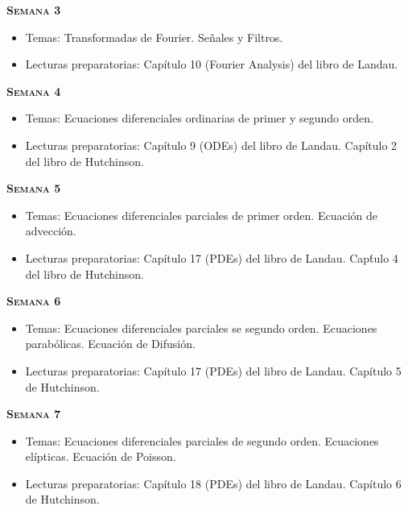 \documentclass[letterpaper,10pt,onecolumn]{article}
\begin{document}
\noindent\textbf{\textsc{Semana 3}}\\[-0.5cm]
\begin{itemize}
\item Temas: Transformadas de Fourier. Se\~nales y Filtros. \\[-0.6cm]
\item Lecturas preparatorias: Cap\'itulo 10 (Fourier Analysis) del
  libro de Landau.\\[-0.6cm] 
\end{itemize}


\noindent\textbf{\textsc{Semana 4}}\\[-0.5cm]
\begin{itemize}
\item Temas: Ecuaciones diferenciales ordinarias de primer y segundo orden. \\[-0.6cm]
\item Lecturas preparatorias: Cap\'itulo 9 (ODEs) del libro de
  Landau. Cap\'itulo 2 del libro de Hutchinson. \\[-0.6cm] 
\end{itemize}

\noindent\textbf{\textsc{Semana 5}}\\[-0.5cm]
\begin{itemize}
\item Temas: Ecuaciones diferenciales parciales de primer orden. Ecuación de advección. \\[-0.6cm]
\item Lecturas preparatorias: Cap\'itulo 17 (PDEs) del libro de
  Landau. Cap\'tulo 4 del libro de Hutchinson. \\[-0.6cm] 
\end{itemize}


\noindent\textbf{\textsc{Semana 6}}\\[-0.5cm]
\begin{itemize}
\item Temas: Ecuaciones diferenciales parciales se segundo orden. Ecuaciones parabólicas.   Ecuaci\'on de Difusi\'on. \\[-0.6cm]
\item Lecturas preparatorias: Cap\'itulo 17 (PDEs) del libro de
  Landau. Cap\'itulo 5 de Hutchinson. \\[-0.6cm] 
\end{itemize}

\noindent\textbf{\textsc{Semana 7}}\\[-0.5cm]
\begin{itemize}
\item Temas: Ecuaciones diferenciales parciales de segundo orden. Ecuaciones elípticas. Ecuación de Poisson. \\[-0.6cm]
\item Lecturas preparatorias: Cap\'itulo 18 (PDEs) del libro de
  Landau. Cap\'itulo 6 de Hutchinson. \\[-0.6cm] 
\\[-0.6cm]
\end{itemize}
\end{document}
